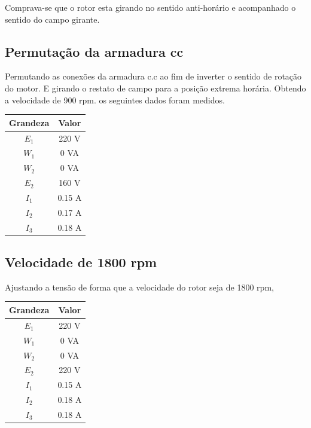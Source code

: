 \documentclass[paper=a4, fontsize=11pt]{article}
\begin{document}
Comprava-se que o rotor esta girando no sentido
anti-horário e acompanhado o sentido do campo girante.

\subsection{Permutação da armadura cc}

Permutando as conexões da armadura c.c ao fim de inverter
o sentido de rotação do motor. E girando o restato de
campo para a posição extrema horária. Obtendo a velocidade
de 900 rpm. os seguintes dados foram medidos.

\begin{center}
    \begin{tabular}{c|c}
            Grandeza & Valor  \\
            \hline
            $E_1$ & 220 V \\
            $W_1$ & 0  VA \\
            $W_2$ & 0  VA \\
            $E_2$ & 160 V\\
            $I_1$ & 0.15 A\\
            $I_2$ & 0.17 A \\
            $I_3$ & 0.18 A \\
    \end{tabular}
\end{center}

\subsection{Velocidade de 1800 rpm}

Ajustando a tensão de forma que a velocidade do rotor
seja de 1800 rpm, 

\begin{center}
    \begin{tabular}{c|c}
            Grandeza & Valor  \\
            \hline
            $E_1$ & 220 V \\
            $W_1$ & 0  VA \\
            $W_2$ & 0  VA \\
            $E_2$ & 220 V\\
            $I_1$ & 0.15 A\\
            $I_2$ & 0.18 A \\
            $I_3$ & 0.18 A \\
    \end{tabular}
\end{center}
\end{document}
